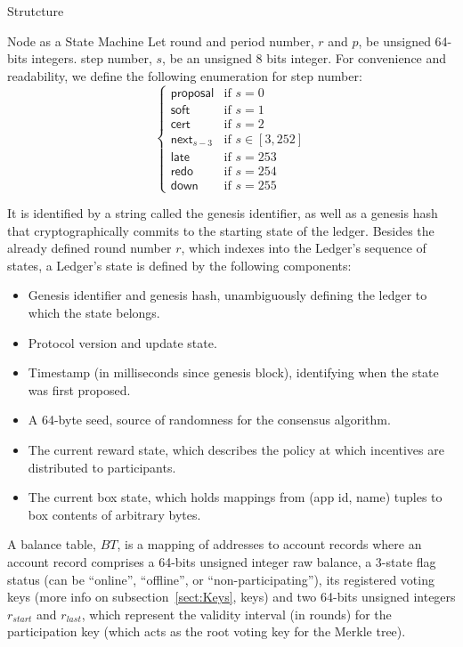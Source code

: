 \documentclass[10pt,a4paper]{article}
\begin{document}
\begin{section}{Strutcture}
\begin{subsection}{Node as a State Machine}
Let round and period number, $r$ and $p$, be unsigned 64-bits integers. 
step number, $s$, be an unsigned 8 bits integer.
For convenience and readability, we define the following enumeration for step number:
\begin{equation}\label{table:s}
\left\{    
    \begin{array}{ll}
        \mathsf{proposal}&\mbox{if }s=0 \\
        \mathsf{soft}&\mbox{if }s=1 \\
        \mathsf{cert}&\mbox{if }s=2\\
        \mathsf{next}_{s-3}&\mbox{if }s\in [3, 252]\\
        \mathsf{late}&\mbox{if }s=253\\
        \mathsf{redo}&\mbox{if }s=254\\
        \mathsf{down}&\mbox{if }s=255
    \end{array}
\right.
\end{equation}

It is identified by a string called the genesis identifier, as well as a genesis hash that cryptographically 
commits to the starting state of the ledger.
Besides the already defined round number $r$, which indexes into the Ledger's sequence of states,
a Ledger's state is defined by the following components:
\begin{itemize}
    \item Genesis identifier and genesis hash, unambiguously defining the ledger 
    to which the state belongs.
    \item Protocol version and update state.
    \item Timestamp (in milliseconds since genesis block), identifying when the state was first proposed.
    \item A 64-byte seed, source of randomness for the consensus algorithm.
    \item The current reward state, which describes the policy at which incentives
    are distributed to participants.
    \item The current box state, which holds mappings from (app id, name) tuples
    to box contents of arbitrary bytes.
\end{itemize}

A {\sf balance table}, $BT$, is a mapping of addresses to 
account records where an {\sf account record} comprises 
 a 64-bits unsigned integer raw balance, 
 a 3-state flag status (can be ``online'', ``offline'', or ``non-participating''),
 its registered voting keys (more info on subsection~\ref{sect:Keys}, keys) and 
 two 64-bits unsigned integers $r_{start}$ and $r_{last}$, which represent the 
   validity interval (in rounds)
   for the participation key (which acts as the root voting key for the Merkle 
   tree).


\end{subsection}
\end{section}
\end{document}
